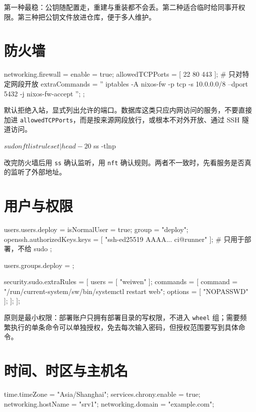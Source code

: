 第一种最稳：公钥随配置走，重建与重装都不会丢。第二种适合临时给同事开权限。第三种把公钥文件放进仓库，便于多人维护。

\section{防火墙}

\begin{nixcode}
networking.firewall = {
  enable = true;
  allowedTCPPorts = [
    22
    80
    443
  ];
  # 只对特定网段开放
  extraCommands = ''
    iptables -A nixos-fw -p tcp -s 10.0.0.0/8 --dport 5432 -j nixos-fw-accept
  '';
};
\end{nixcode}

默认拒绝入站，显式列出允许的端口。数据库这类只应内网访问的服务，不要直接加进 \texttt{allowedTCPPorts}，而是按来源网段放行，或根本不对外开放、通过 SSH 隧道访问。

\begin{shellsession}
$ sudo nft list ruleset | head -20
$ ss -tlnp
\end{shellsession}

改完防火墙后用 \texttt{ss} 确认监听，用 \texttt{nft} 确认规则。两者不一致时，先看服务是否真的监听了外部地址。

\section{用户与权限}

\begin{nixcode}
users.users.deploy = {
  isNormalUser = true;
  group = "deploy";
  openssh.authorizedKeys.keys = [ "ssh-ed25519 AAAA... ci@runner" ];
  # 只用于部署，不给 sudo
};

users.groups.deploy = { };

security.sudo.extraRules = [
  {
    users = [ "weiwen" ];
    commands = [
      {
        command = "/run/current-system/sw/bin/systemctl restart web";
        options = [ "NOPASSWD" ];
      }
    ];
  }
];
\end{nixcode}

原则是最小权限：部署账户只拥有部署目录的写权限，不进入 \texttt{wheel} 组；需要频繁执行的单条命令可以单独授权，免去每次输入密码，但授权范围要写到具体命令。

\section{时间、时区与主机名}

\begin{nixcode}
time.timeZone = "Asia/Shanghai";
services.chrony.enable = true;
networking.hostName = "srv1";
networking.domain = "example.com";
\end{nixcode}

